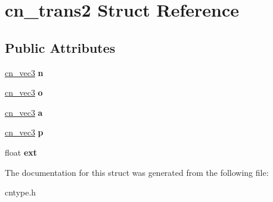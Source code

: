 \hypertarget{structcn__trans2}{\section{cn\-\_\-trans2 Struct Reference}
\label{structcn__trans2}
}
\subsection*{Public Attributes}
\begin{DoxyCompactItemize}
\item 
\hypertarget{structcn__trans2_aab9125633d13ba361184f716a1a89d05}{\hyperlink{structcn__vec3}{cn\-\_\-vec3} {\bfseries n}}\label{structcn__trans2_aab9125633d13ba361184f716a1a89d05}

\item 
\hypertarget{structcn__trans2_a033f077851173cfc7b9e8518ec5ce1d3}{\hyperlink{structcn__vec3}{cn\-\_\-vec3} {\bfseries o}}\label{structcn__trans2_a033f077851173cfc7b9e8518ec5ce1d3}

\item 
\hypertarget{structcn__trans2_ad2a35be485837da5eded5eed7f114841}{\hyperlink{structcn__vec3}{cn\-\_\-vec3} {\bfseries a}}\label{structcn__trans2_ad2a35be485837da5eded5eed7f114841}

\item 
\hypertarget{structcn__trans2_af5270db31ffba46466e6e78c939309c3}{\hyperlink{structcn__vec3}{cn\-\_\-vec3} {\bfseries p}}\label{structcn__trans2_af5270db31ffba46466e6e78c939309c3}

\item 
\hypertarget{structcn__trans2_a6900755f644bc2671c3d5b27e66f5c64}{float {\bfseries ext}}\label{structcn__trans2_a6900755f644bc2671c3d5b27e66f5c64}

\end{DoxyCompactItemize}


The documentation for this struct was generated from the following file\-:\begin{DoxyCompactItemize}
\item 
cntype.\-h\end{DoxyCompactItemize}

